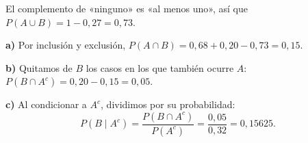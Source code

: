 El complemento de «ninguno» es «al menos uno», así que $P(A\cup B)=1-0{,}27=0{,}73$.

\textbf{a)} Por inclusión y exclusión, $P(A\cap B)=0{,}68+0{,}20-0{,}73=\boxed{0{,}15}$.

\textbf{b)} Quitamos de $B$ los casos en los que también ocurre $A$: $P(B\cap A^c)=0{,}20-0{,}15=\boxed{0{,}05}$.

\textbf{c)} Al condicionar a $A^c$, dividimos por su probabilidad:
\[
P(B\mid A^c)=\frac{P(B\cap A^c)}{P(A^c)}=\frac{0{,}05}{0{,}32}=\boxed{0{,}15625}.
\]

